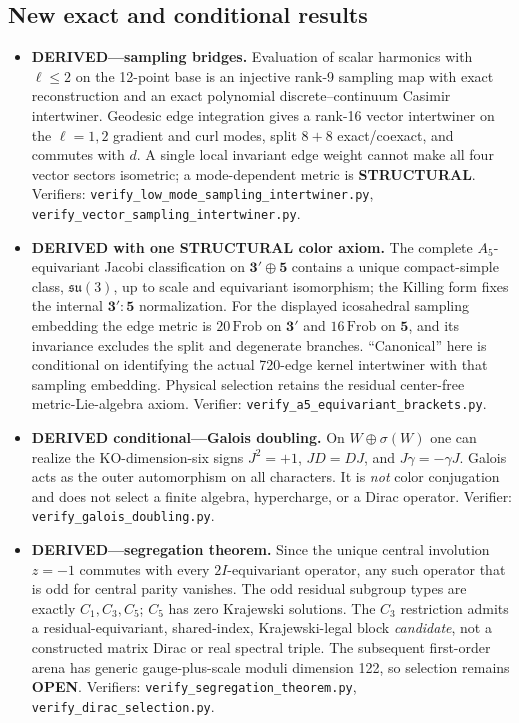\documentclass[12pt,a4paper]{article}
\theoremstyle{definition}
\begin{document}
\subsection{New exact and conditional results}

\begin{itemize}
\item \textbf{DERIVED---sampling bridges.} Evaluation of scalar harmonics with $\ell\leq2$ on the 12-point base is an injective rank-9 sampling map with exact reconstruction and an exact polynomial discrete--continuum Casimir intertwiner.  Geodesic edge integration gives a rank-16 vector intertwiner on the $\ell=1,2$ gradient and curl modes, split $8+8$ exact/coexact, and commutes with $d$.  A single local invariant edge weight cannot make all four vector sectors isometric; a mode-dependent metric is \textbf{STRUCTURAL}.  Verifiers: \texttt{verify\_low\_mode\_sampling\_intertwiner.py}, \texttt{verify\_vector\_sampling\_intertwiner.py}.
\item \textbf{DERIVED with one STRUCTURAL color axiom.} The complete $A_5$-equivariant Jacobi classification on $\mathbf{3'}\oplus\mathbf5$ contains a unique compact-simple class, $\mathfrak{su}(3)$, up to scale and equivariant isomorphism; the Killing form fixes the internal $\mathbf{3'}:\mathbf5$ normalization.  For the displayed icosahedral sampling embedding the edge metric is $20\,\mathrm{Frob}$ on $\mathbf{3'}$ and $16\,\mathrm{Frob}$ on $\mathbf5$, and its invariance excludes the split and degenerate branches.  ``Canonical'' here is conditional on identifying the actual 720-edge kernel intertwiner with that sampling embedding.  Physical selection retains the residual center-free metric-Lie-algebra axiom.  Verifier: \texttt{verify\_a5\_equivariant\_brackets.py}.
\item \textbf{DERIVED conditional---Galois doubling.} On $W\oplus\sigma(W)$ one can realize the KO-dimension-six signs $J^2=+1$, $JD=DJ$, and $J\gamma=-\gamma J$.  Galois acts as the outer automorphism on all characters.  It is \emph{not} color conjugation and does not select a finite algebra, hypercharge, or a Dirac operator.  Verifier: \texttt{verify\_galois\_doubling.py}.
\item \textbf{DERIVED---segregation theorem.} Since the unique central involution $z=-1$ commutes with every $2I$-equivariant operator, any such operator that is odd for central parity vanishes.  The odd residual subgroup types are exactly $C_1,C_3,C_5$; $C_5$ has zero Krajewski solutions.  The $C_3$ restriction admits a residual-equivariant, shared-index, Krajewski-legal block \emph{candidate}, not a constructed matrix Dirac or real spectral triple.  The subsequent first-order arena has generic gauge-plus-scale moduli dimension 122, so selection remains \textbf{OPEN}.  Verifiers: \texttt{verify\_segregation\_theorem.py}, \texttt{verify\_dirac\_selection.py}.

\end{itemize}
\end{document}
